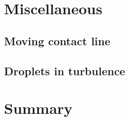 \chapter{Miscellaneous}

\section{Moving contact line}

\section{Droplets in turbulence}


\chapter{Summary}






